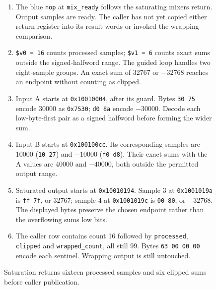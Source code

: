 \begin{figure}[htbp]
  \par\smallskip
  \begin{minipage}{\linewidth}
    \small
    \begin{enumerate}
      \setlength{\itemsep}{2pt}
            \setlength{\parsep}{0pt}
      \item The blue \texttt{nop} at \texttt{mix\_ready} follows the saturating mixer\textquotesingle s return. Output samples are ready. The caller has not yet copied either return register into its result words or invoked the wrapping comparison.
      \item \texttt{\$v0 = 16} counts processed samples; \texttt{\$v1 = 6} counts exact sums outside the signed-halfword range. The guided loop handles two eight-sample groups. An exact sum of 32767 or $-32768$ reaches an endpoint without counting as clipped.
      \item Input A starts at \texttt{0x10010004}, after its guard. Bytes \texttt{30 75} encode 30000 as \texttt{0x7530}; \texttt{d0 8a} encode $-30000$. Decode each low-byte-first pair as a signed halfword before forming the wider sum.
      \item Input B starts at \texttt{0x100100cc}. Its corresponding samples are 10000 (\texttt{10 27}) and $-10000$ (\texttt{f0 d8}). Their exact sums with the A values are 40000 and $-40000$, both outside the permitted output range.
      \item Saturated output starts at \texttt{0x10010194}. Sample 3 at \texttt{0x1001019a} is \texttt{ff 7f}, or 32767; sample 4 at \texttt{0x1001019c} is \texttt{00 80}, or $-32768$. The displayed bytes preserve the chosen endpoint rather than the overflowing sum\textquotesingle s low bits.
      \item The caller row contains count 16 followed by \texttt{processed}, \texttt{clipped} and \texttt{wrapped\_count}, all still 99. Bytes \texttt{63 00 00 00} encode each sentinel. Wrapping output is still untouched.
    \end{enumerate}
  \end{minipage}
  \caption{Saturation returns sixteen processed samples and six clipped sums before caller publication.}
  \label{capture:020-pcm-mixing-f01}
  \label{pcm-f01}
\end{figure}
\par
